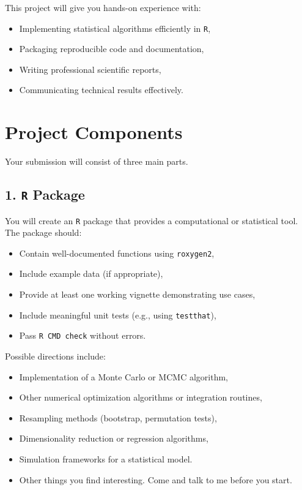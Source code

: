 \documentclass[
  letterpaper,
  DIV=11,
  numbers=noendperiod]{scrreprt}
\providecommand{\tightlist}{%
  \setlength{\itemsep}{0pt}\setlength{\parskip}{0pt}}
\begin{document}
This project will give you hands-on experience with:

\begin{itemize}
\tightlist
\item
  Implementing statistical algorithms efficiently in \texttt{R},
\item
  Packaging reproducible code and documentation,
\item
  Writing professional scientific reports,
\item
  Communicating technical results effectively.
\end{itemize}

\section{Project Components}\label{project-components}

Your submission will consist of three main parts.

\subsection{\texorpdfstring{1. \texttt{R}
Package}{1. R Package}}\label{r-package}

You will create an \texttt{R} package that provides a computational or
statistical tool. The package should:

\begin{itemize}
\tightlist
\item
  Contain well-documented functions using \texttt{roxygen2},
\item
  Include example data (if appropriate),
\item
  Provide at least one working vignette demonstrating use cases,
\item
  Include meaningful unit tests (e.g., using \texttt{testthat}),
\item
  Pass \texttt{R\ CMD\ check} without errors.
\end{itemize}

Possible directions include:

\begin{itemize}
\tightlist
\item
  Implementation of a Monte Carlo or MCMC algorithm,
\item
  Other numerical optimization algorithms or integration routines,
\item
  Resampling methods (bootstrap, permutation tests),
\item
  Dimensionality reduction or regression algorithms,
\item
  Simulation frameworks for a statistical model.
\item
  Other things you find interesting. Come and talk to me before you
  start.
\end{itemize}
\end{document}
